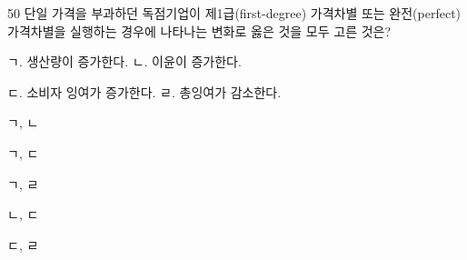 \begin{question}{50}
단일 가격을 부과하던 독점기업이 제1급(first-degree) 가격차별 또는 완전(perfect) 가격차별을 실행하는 경우에 나타나는 변화로 옳은 것을 모두 고른 것은?
\begin{framedtext}
ㄱ. 생산량이 증가한다. \hfill ㄴ. 이윤이 증가한다. \hspace{2em} \par
ㄷ. 소비자 잉여가 증가한다. \hfill ㄹ. 총잉여가 감소한다. \hspace{2em}
\end{framedtext}
\begin{choices}
  \item ㄱ, ㄴ
  \item ㄱ, ㄷ
  \item ㄱ, ㄹ
  \item ㄴ, ㄷ
  \item ㄷ, ㄹ
\end{choices}
\end{question}
